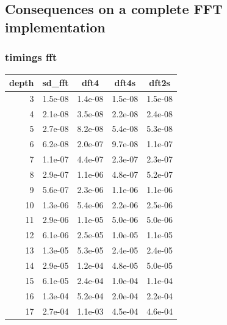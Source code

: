 \documentclass[10pt]{beamer}
\begin{document}
\subsection{Consequences on a complete FFT implementation}
\begin{frame}
    \frametitle{timings fft}
    \begin{center}
        \begin{longtable}{|r|*{4}{c|}}
            \hline
            \rowcolor{myGray}
            depth & sd\_fft & dft4 & dft4s & dft2s \\
            \hline
            \cellcolor{myGray} 3 & 1.5e-08 & 1.4e-08 & 1.5e-08 & 1.5e-08 \\
            \hline
            \cellcolor{myGray} 4 & 2.1e-08 & 3.5e-08 & 2.2e-08 & 2.4e-08 \\
            \hline
            \cellcolor{myGray} 5 & 2.7e-08 & 8.2e-08 & 5.4e-08 & 5.3e-08 \\
            \hline
            \cellcolor{myGray} 6 & 6.2e-08 & 2.0e-07 & 9.7e-08 & 1.1e-07 \\
            \hline
            \cellcolor{myGray} 7 & 1.1e-07 & 4.4e-07 & 2.3e-07 & 2.3e-07 \\
            \hline
            \cellcolor{myGray} 8 & 2.9e-07 & 1.1e-06 & 4.8e-07 & 5.2e-07 \\
            \hline
            \cellcolor{myGray} 9 & 5.6e-07 & 2.3e-06 & 1.1e-06 & 1.1e-06 \\
            \hline
            \cellcolor{myGray} 10 & 1.3e-06 & 5.4e-06 & 2.2e-06 & 2.5e-06 \\
            \hline
            \cellcolor{myGray} 11 & 2.9e-06 & 1.1e-05 & 5.0e-06 & 5.0e-06 \\
            \hline
            \cellcolor{myGray} 12 & 6.1e-06 & 2.5e-05 & 1.0e-05 & 1.1e-05 \\
            \hline
            \cellcolor{myGray} 13 & 1.3e-05 & 5.3e-05 & 2.4e-05 & 2.4e-05 \\
            \hline
            \cellcolor{myGray} 14 & 2.9e-05 & 1.2e-04 & 4.8e-05 & 5.0e-05 \\
            \hline
            \cellcolor{myGray} 15 & 6.1e-05 & 2.4e-04 & 1.0e-04 & 1.1e-04 \\
            \hline
            \cellcolor{myGray} 16 & 1.3e-04 & 5.2e-04 & 2.0e-04 & 2.2e-04 \\
            \hline
            \cellcolor{myGray} 17 & 2.7e-04 & 1.1e-03 & 4.5e-04 & 4.6e-04 \\

\end{longtable}
\end{center}
\end{frame}
\end{document}
